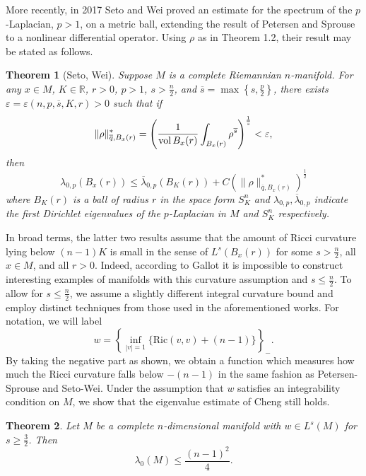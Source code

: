 \documentclass{amsart}
\newtheorem{theorem}{Theorem}[section]
\theoremstyle{definition}
\theoremstyle{remark}
\numberwithin{equation}{section}
\begin{document}
More recently, in 2017 Seto and Wei \cite{SW} proved an estimate for the spectrum of the $p$-Laplacian, $p>1$, on a metric ball, extending the result of Petersen and Sprouse to a nonlinear differential operator. Using $\rho$ as in Theorem 1.2, their result may be stated as follows.

\begin{theorem}[Seto, Wei] Suppose $M$ is a complete Riemannian $n$-manifold. For any $x\in M$, $K\in\mathbb{R}$, $r>0$, $p>1$, $s>\frac{n}{2}$, and $\overline{s}=\max\left\{s,\frac{p}{2}\right\}$, there exists $\varepsilon = \varepsilon(n,p,\overline{s}, K,r)>0$ such that if
\begin{equation*}
\|\rho\|_{\overline{q},B_x(r)}^*=\left(\frac{1}{\text{\rm vol}\,B_x(r)}\int_{B_x(r)}\rho^{\overline{s}}\right)^\frac{1}{\overline{s}}<\varepsilon,
\end{equation*}
then
\begin{equation*}
\lambda_{0,p}(B_x(r))\leq \overline{\lambda}_{0,p}(B_K(r))+C\left(\|\rho\|_{\overline{q},B_x(r)}^*\right)^{\frac{1}{2}}
\end{equation*}
where $B_K(r)$ is a ball of radius $r$ in the space form $S_K^n$ and $\lambda_{0,p},\overline{\lambda}_{0,p}$ indicate the first Dirichlet eigenvalues of the $p$-Laplacian in $M$ and $S_K^n$ respectively. \end{theorem}

In broad terms, the latter two results assume that the amount of Ricci curvature lying below $(n-1)K$ is small in the sense of $L^s(B_x(r))$ for some $s>\frac{n}{2}$, all $x\in M$, and all $r>0$. Indeed, according to Gallot \cite{Gallot} it is impossible to construct interesting examples of manifolds with this curvature assumption and $s\leq \frac{n}{2}$. To allow for $s\leq\frac{n}{2}$, we assume a slightly different integral curvature bound and employ distinct techniques from those used in the aforementioned works. For notation, we will label
\begin{equation*}
w = \left\{\inf_{|v|=1}\{\text{Ric}(v,v)+(n-1)\}\right\}_{-}.
\end{equation*}
By taking the negative part as shown, we obtain a function which measures how much the Ricci curvature falls below $-(n-1)$ in the same fashion as Petersen-Sprouse and Seto-Wei. Under the assumption that $w$ satisfies an integrability condition on $M$, we show that the eigenvalue estimate of Cheng still holds.

\begin{theorem} Let $M$ be a complete $n$-dimensional manifold with $w\in L^s(M)$ for $s\geq \frac{3}{2}$. Then 
    \begin{equation*}
    \lambda_0(M)\leq \frac{(n-1)^2}{4}.
    \end{equation*}
\end{theorem}
\end{document}
